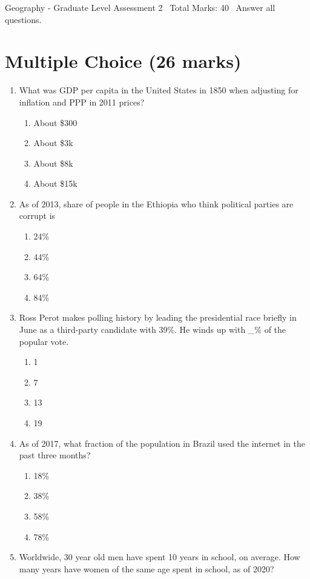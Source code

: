 \documentclass[12pt]{article}
\begin{document}
\begin{center}
Geography - Graduate Level Assessment 2 \
Total Marks: 40 \
Answer all questions.
\end{center}

\section*{Multiple Choice (26 marks)}
\begin{enumerate}[label=\arabic*.]
\item What was GDP per capita in the United States in 1850 when adjusting for inflation and PPP in 2011 prices?
\begin{enumerate}[label=(\alph*)]
    \item About \$300
    \item About \$3k
    \item About \$8k
    \item About \$15k
\end{enumerate}
\item As of 2013, share of people in the Ethiopia who think political parties are corrupt is
\begin{enumerate}[label=(\alph*)]
    \item 24\%
    \item 44\%
    \item 64\%
    \item 84\%
\end{enumerate}
\item Ross Perot makes polling history by leading the presidential race briefly in June as a third-party candidate with 39\%. He winds up with \_\% of the popular vote.
\begin{enumerate}[label=(\alph*)]
    \item 1
    \item 7
    \item 13
    \item 19
\end{enumerate}
\item As of 2017, what fraction of the population in Brazil used the internet in the past three months?
\begin{enumerate}[label=(\alph*)]
    \item 18\%
    \item 38\%
    \item 58\%
    \item 78\%
\end{enumerate}
\item Worldwide, 30 year old men have spent 10 years in school, on average. How many years have women of the same age spent in school, as of 2020?

\end{enumerate}
\end{document}
